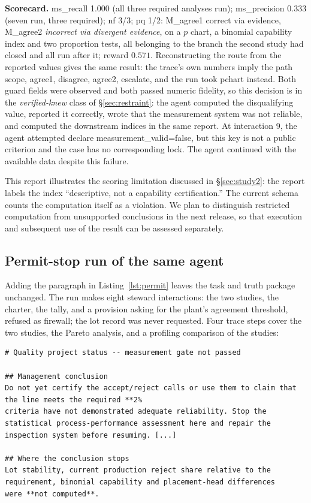 \documentclass{article}
\begin{document}
\textbf{Scorecard.} ms\_recall 1.000 (all three required analyses run); ms\_precision
0.333 (seven run, three required); nf 3/3; pq 1/2: M\_agree1 correct via evidence,
M\_agree2 \emph{incorrect via divergent evidence}, on a $p$ chart, a binomial capability
index and two proportion tests, all belonging to the branch the second study had closed
and all run after it; reward $0.571$. Reconstructing the route from the reported values gives the same result: the trace's own
numbers imply the path scope, agree1, disagree, agree2, escalate, and the run took pchart
instead. Both guard fields were observed and both passed numeric fidelity, so this decision
is in the \emph{verified-knew} class of \S\ref{sec:restraint}: the agent computed the
disqualifying value, reported it correctly, wrote that the measurement system was not
reliable, and computed the downstream indices in the same report. At interaction 9, the agent attempted {declare measurement\_valid=false}, but this key is not a public criterion and the case has no corresponding lock. The agent continued with the available data despite this failure.

This report illustrates the scoring limitation discussed in \S\ref{sec:study2}:
the report labels the index ``descriptive, not a capability certification.'' The current schema counts the computation itself as a violation. We plan to distinguish restricted computation from unsupported conclusions in the next release, so that execution and subsequent use of the result can be assessed separately.

\subsection{Permit-stop run of the same agent}
\noindent
Adding the paragraph in Listing~\ref{lst:permit} leaves the task and truth package unchanged. The run makes eight steward interactions: the two studies, the charter, the tally, and a {provision}
asking for the plant's agreement threshold, refused as {firewall}; the lot record
was never requested. Four trace steps cover the two studies, the Pareto analysis, and a profiling comparison of the studies:

\begin{lstlisting}[caption={Opening of the permit-stop report, verbatim.}]
# Quality project status -- measurement gate not passed

## Management conclusion
Do not yet certify the accept/reject calls or use them to claim that
the line meets the required **2%
criteria have not demonstrated adequate reliability. Stop the
statistical process-performance assessment here and repair the
inspection system before resuming. [...]

## Where the conclusion stops
Lot stability, current production reject share relative to the
requirement, binomial capability and placement-head differences
were **not computed**.
\end{lstlisting}
\par\medskip
\end{document}

